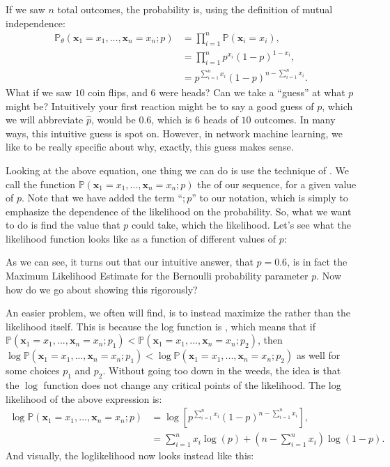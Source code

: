 \documentclass[letterpaper,10pt,english]{jupyterBook}
\begin{document}
\sphinxAtStartPar
If we saw \(n\) total outcomes, the probability is, using the definition of mutual independence:
\begin{align*}
    \mathbb P_\theta(\mathbf x_1 = x_1, ..., \mathbf x_{n} = x_{n}; p) &= \prod_{i = 1}^{n}\mathbb P(\mathbf x_i = x_i), \\
    &= \prod_{i = 1}^n p^{x_i}(1 - p)^{1 - x_i}, \\
    &= p^{\sum_{i = 1}^n x_i}(1 - p)^{n - \sum_{i = 1}^n x_i}.
\end{align*}
\sphinxAtStartPar
What if we saw \(10\) coin flips, and \(6\) were heads? Can we take a “guess” at what \(p\) might be? Intuitively your first reaction might be to say a good guess of \(p\), which we will abbreviate \(\hat p\), would be \(0.6\), which is \(6\) heads of \(10\) outcomes. In many ways, this intuitive guess is spot on. However, in network machine learning, we like to be really specific about why, exactly, this guess makes sense.

\sphinxAtStartPar
Looking at the above equation, one thing we can do is use the technique of . We call the function \(\mathbb P(\mathbf x_1 = x_1, ..., \mathbf x_n = x_n; p)\) the  of our sequence, for a given value of \(p\). Note that we have added the term “\(; p\)” to our notation, which is simply to emphasize the dependence of the likelihood on the probability. So, what we  want to do is find the value that \(p\) could take, which  the likelihood. Let’s see what the likelihood function looks like as a function of different values of \(p\):

\noindent{}

\sphinxAtStartPar
As we can see, it turns out that our intuitive answer, that \(p=0.6\), is in fact the Maximum Likelihood Estimate for the Bernoulli probability parameter \(p\). Now how do we go about showing this rigorously?

\sphinxAtStartPar
An easier problem, we often will find, is to instead maximize the  rather than the likelihood itself. This is because the log function is , which means that if \(\mathbb P(\mathbf x_1 = x_1, ..., \mathbf x_n = x_n; p_1) < \mathbb P(\mathbf x_1 = x_1, ..., \mathbf x_n = x_n; p_2)\), then \(\log\mathbb P(\mathbf x_1 = x_1, ..., \mathbf x_n = x_n; p_1) < \log \mathbb P(\mathbf x_1 = x_1, ..., \mathbf x_n = x_n; p_2)\) as well for some choices \(p_1\) and \(p_2\). Without going too down in the weeds, the idea is that the \(\log\) function does not change any critical points of the likelihood. The log likelihood of the above expression is:
\begin{align*}
\log \mathbb P(\mathbf x_1 = x_1, ..., \mathbf x_{n} = x_{n}; p) &= \log \left[p^{\sum_{i = 1}^n x_i}(1 - p)^{n - \sum_{i = 1}^n x_i}\right], \\
&= \sum_{i = 1}^n x_i \log(p) + \left(n - \sum_{i = 1}^n x_i\right)\log(1 - p).
\end{align*}
\sphinxAtStartPar
And visually, the log\sphinxhyphen{}likelihood now looks instead like this:
\end{document}
